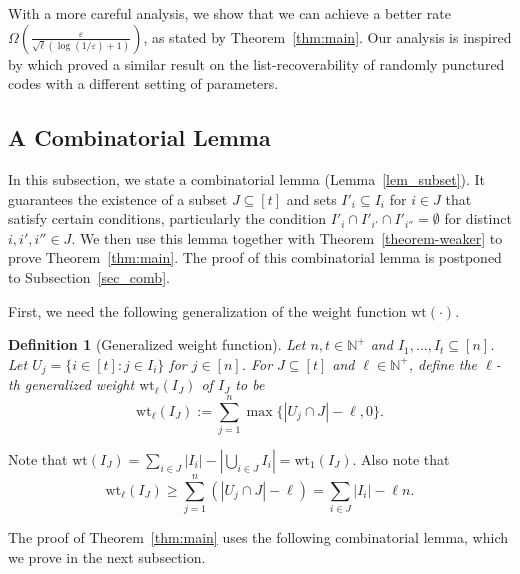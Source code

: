 \documentclass[11pt]{article}
\newtheorem{definition}[theorem]{Definition}
\renewcommand{\epsilon}{\varepsilon}
\begin{document}
With a more careful analysis, we show that we can achieve a better rate  $\Omega(\frac{\epsilon}{\sqrt{\ell}(\log(1/\epsilon)+1)})$, as stated by Theorem~\ref{thm:main}.
Our analysis is inspired by \cite{LP20} which proved a similar result on the list-recoverability of randomly punctured
codes with a different setting of parameters.

\subsection{A Combinatorial Lemma}

In this subsection, we state a combinatorial lemma (Lemma~\ref{lem_subset}). It guarantees the existence of a subset $J\subseteq [t]$ and sets $I'_i\subseteq I_i$ for $i\in J$  that satisfy certain conditions, particularly the condition  $I'_{i}\cap I'_{i'}\cap I'_{i''}=\emptyset$ for distinct  $i,i',i''\in J$. We then use this lemma together with Theorem~\ref{theorem-weaker} to  prove Theorem~\ref{thm:main}.
The proof of this combinatorial lemma is postponed to Subsection~\ref{sec_comb}.

First, we need the following generalization of the weight function $\mathrm{wt}(\cdot)$.

\begin{definition}[Generalized weight function]
Let $n,t\in\mathbb{N}^+$ and $I_1,\dots, I_t\subseteq [n]$. Let $U_j=\{i\in [t]: j\in I_i\}$ for $j\in [n]$. For $J\subseteq [t]$ and $\ell\in\mathbb{N}^+$, define the \emph{$\ell$-th generalized weight} $\mathrm{wt}_{\ell}(I_J)$ of $I_J$ to be
\[
\mathrm{wt}_\ell(I_J):=\sum_{j=1}^n \max\{|U_j\cap J|-\ell, 0\}.
\]
\end{definition}
Note that $\mathrm{wt}(I_J)=\sum_{i\in J} |I_i|-|\bigcup_{i\in J} I_i|=\mathrm{wt}_1(I_J)$. Also note that
\begin{equation}\label{eq_weightell}
\mathrm{wt}_\ell(I_J)\geq\sum_{j=1}^n  \left(|U_j\cap J|-\ell\right) = \sum_{i\in J} |I_i| - \ell n.
\end{equation}


The proof of  Theorem~\ref{thm:main} uses the following combinatorial lemma, which we prove in the next subsection.
\end{document}

